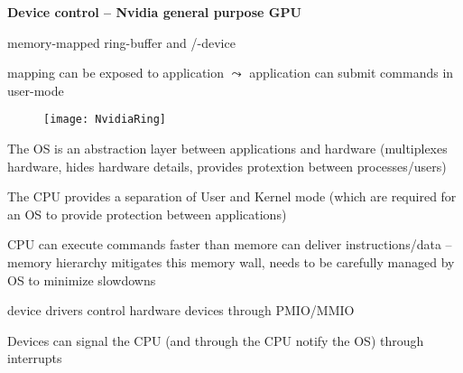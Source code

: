 \textbf{Device control -- Nvidia general purpose GPU}
\begin{items}
	\item memory-mapped ring-buffer and /-device
	\item mapping can be exposed to application \( \leadsto \) application can submit commands in user-mode
	\begin{figure}[H]\centering\label{NvidiaRing}\texttt{[image: NvidiaRing]}\end{figure}
\end{items}

\begin{summary}
	\item The OS is an abstraction layer between applications and hardware (multiplexes hardware, hides hardware details, provides protextion between processes/users)
	\item The CPU provides a separation of User and Kernel mode (which are required for an OS to provide protection between applications)
	\item CPU can execute commands faster than memore can deliver instructions/data -- memory hierarchy mitigates this memory wall, needs to be carefully managed by OS to minimize slowdowns
	\item device drivers control hardware devices through PMIO/MMIO
	\item Devices can signal the CPU (and through the CPU notify the OS) through interrupts
\end{summary}
